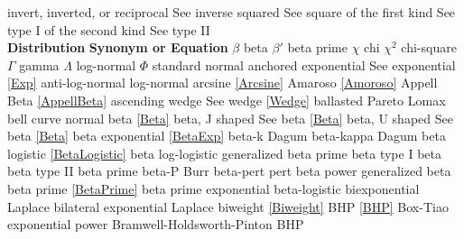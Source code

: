 \noindent
invert, inverted, or reciprocal		\dotfill	See inverse\ncite
squared						\dotfill	See square\ncite
of the first kind					\dotfill	See type I\ncite
of the second kind				\dotfill	See type II\ncite
~\\
\noindent
{\bf Distribution} \hfill {\bf Synonym or Equation}								\ncite
%
$\beta$ 						\dotfill	beta							  	\ncite	%
$\beta'$ 						\dotfill	beta prime							\ncite	%
$\chi$ 							\dotfill	chi									\ncite	%
$\chi^2$ 						\dotfill	chi-square							\ncite 	%
$\Gamma$ 						\dotfill	gamma 								\ncite 	%
$\Lambda$						\dotfill	log-normal 							   	%
$\Phi$							\dotfill	standard normal 					\ncite	%
%
anchored exponential			\dotfill	See exponential \eqref{Exp}			\ncite	%
anti-log-normal 				\dotfill	log-normal 							\ncite	%
arcsine 						\dotfill	\eqref{Arcsine} 					 \ncite	%
Amaroso							\dotfill	\eqref{Amoroso}						\ncite	%
Appell Beta						\dotfill	\eqref{AppellBeta}					 
ascending wedge					\dotfill	See wedge \eqref{Wedge} 			\ncite	%
%
ballasted Pareto				\dotfill	Lomax								\ncite	%
bell curve 						\dotfill	normal 								\ncite	%
beta 							\dotfill	\eqref{Beta} 						\ncite	%
beta, J shaped					\dotfill	See beta \eqref{Beta} 				\ncite	%
beta, U shaped					\dotfill	See beta \eqref{Beta} 				\ncite	%
beta exponential				\dotfill	\eqref{BetaExp}						\ncite	%
beta-k							\dotfill	Dagum									%
beta-kappa 						\dotfill	Dagum  									%
beta logistic					\dotfill	\eqref{BetaLogistic}				\mcite{\self}	%
beta log-logistic				\dotfill	generalized beta prime				\mcite{\self}	%
beta type I 					\dotfill	beta 								\ncite	%
beta type II 					\dotfill	beta prime							\ncite	%
beta-P 							\dotfill	Burr 				 					%
beta-pert						\dotfill	pert 								\ncite	%
beta power						\dotfill	generalized beta					\ncite	%
beta prime 						\dotfill	\eqref{BetaPrime} 					\ncite	%
beta prime exponential			\dotfill	beta-logistic						\mcite{\self} %
biexponential					\dotfill	Laplace								\ncite	%
bilateral exponential  			\dotfill	Laplace 							\ncite	%
biweight						\dotfill	\eqref{Biweight}					\ncite
BHP								\dotfill	\eqref{BHP}							\ncite	%
Box-Tiao						\dotfill	exponential power					\ncite
Bramwell-Holdsworth-Pinton 		\dotfill	BHP 								\ncite	%
